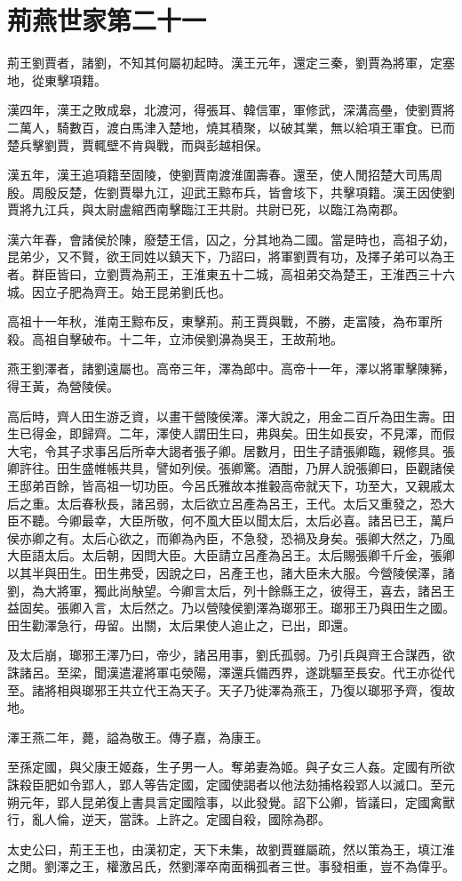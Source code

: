 \chapter{荊燕世家第二十一}

荊王劉賈者，諸劉，不知其何屬初起時。漢王元年，還定三秦，劉賈為將軍，定塞地，從東擊項籍。

漢四年，漢王之敗成皋，北渡河，得張耳、韓信軍，軍修武，深溝高壘，使劉賈將二萬人，騎數百，渡白馬津入楚地，燒其積聚，以破其業，無以給項王軍食。已而楚兵擊劉賈，賈輒壁不肯與戰，而與彭越相保。

漢五年，漢王追項籍至固陵，使劉賈南渡淮圍壽春。還至，使人閒招楚大司馬周殷。周殷反楚，佐劉賈舉九江，迎武王黥布兵，皆會垓下，共擊項籍。漢王因使劉賈將九江兵，與太尉盧綰西南擊臨江王共尉。共尉已死，以臨江為南郡。

漢六年春，會諸侯於陳，廢楚王信，囚之，分其地為二國。當是時也，高祖子幼，昆弟少，又不賢，欲王同姓以鎮天下，乃詔曰，將軍劉賈有功，及擇子弟可以為王者。群臣皆曰，立劉賈為荊王，王淮東五十二城，高祖弟交為楚王，王淮西三十六城。因立子肥為齊王。始王昆弟劉氏也。

高祖十一年秋，淮南王黥布反，東擊荊。荊王賈與戰，不勝，走富陵，為布軍所殺。高祖自擊破布。十二年，立沛侯劉濞為吳王，王故荊地。

燕王劉澤者，諸劉遠屬也。高帝三年，澤為郎中。高帝十一年，澤以將軍擊陳豨，得王黃，為營陵侯。

高后時，齊人田生游乏資，以畫干營陵侯澤。澤大說之，用金二百斤為田生壽。田生已得金，即歸齊。二年，澤使人謂田生曰，弗與矣。田生如長安，不見澤，而假大宅，令其子求事呂后所幸大謁者張子卿。居數月，田生子請張卿臨，親修具。張卿許往。田生盛帷帳共具，譬如列侯。張卿驚。酒酣，乃屏人說張卿曰，臣觀諸侯王邸弟百餘，皆高祖一切功臣。今呂氏雅故本推轂高帝就天下，功至大，又親戚太后之重。太后春秋長，諸呂弱，太后欲立呂產為呂王，王代。太后又重發之，恐大臣不聽。今卿最幸，大臣所敬，何不風大臣以聞太后，太后必喜。諸呂已王，萬戶侯亦卿之有。太后心欲之，而卿為內臣，不急發，恐禍及身矣。張卿大然之，乃風大臣語太后。太后朝，因問大臣。大臣請立呂產為呂王。太后賜張卿千斤金，張卿以其半與田生。田生弗受，因說之曰，呂產王也，諸大臣未大服。今營陵侯澤，諸劉，為大將軍，獨此尚觖望。今卿言太后，列十餘縣王之，彼得王，喜去，諸呂王益固矣。張卿入言，太后然之。乃以營陵侯劉澤為瑯邪王。瑯邪王乃與田生之國。田生勸澤急行，毋留。出關，太后果使人追止之，已出，即還。

及太后崩，瑯邪王澤乃曰，帝少，諸呂用事，劉氏孤弱。乃引兵與齊王合謀西，欲誅諸呂。至梁，聞漢遣灌將軍屯滎陽，澤還兵備西界，遂跳驅至長安。代王亦從代至。諸將相與瑯邪王共立代王為天子。天子乃徙澤為燕王，乃復以瑯邪予齊，復故地。

澤王燕二年，薨，謚為敬王。傳子嘉，為康王。

至孫定國，與父康王姬姦，生子男一人。奪弟妻為姬。與子女三人姦。定國有所欲誅殺臣肥如令郢人，郢人等告定國，定國使謁者以他法劾捕格殺郢人以滅口。至元朔元年，郢人昆弟復上書具言定國陰事，以此發覺。詔下公卿，皆議曰，定國禽獸行，亂人倫，逆天，當誅。上許之。定國自殺，國除為郡。

太史公曰，荊王王也，由漢初定，天下未集，故劉賈雖屬疏，然以策為王，填江淮之閒。劉澤之王，權激呂氏，然劉澤卒南面稱孤者三世。事發相重，豈不為偉乎。
